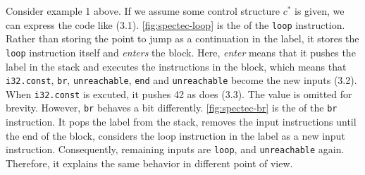 Consider example 1 above.
If we assume some control structure $c^*$ is given, we can express the code
like (3.1).
\cref{fig:spectec-loop} is the \spectecp{} of the \texttt{loop} instruction.
Rather than storing the point to jump as a continuation in the label, it stores
the \texttt{loop} instruction itself and \textit{enters} the block.
Here, \textit{enter} means that it pushes the label in the stack and executes
the instructions in the block, which means that \texttt{i32.const},
\texttt{br}, \texttt{unreachable}, \texttt{end} and \texttt{unreachable} become
the new inputs (3.2).
When \texttt{i32.const} is excuted, it pushes 42 as \officialp{} does (3.3).
The value is omitted for brevity.
However, \texttt{br} behaves a bit differently.
\cref{fig:spectec-br} is the \spectecp{} of the \texttt{br} instruction.
It pops the label from the stack, removes the input instructions until the end
of the block, considers the loop instruction in the label as a new input
instruction.
Consequently, remaining inputs are \texttt{loop}, and \texttt{unreachable}
again.
Therefore, it explains the same behavior in different point of view.






